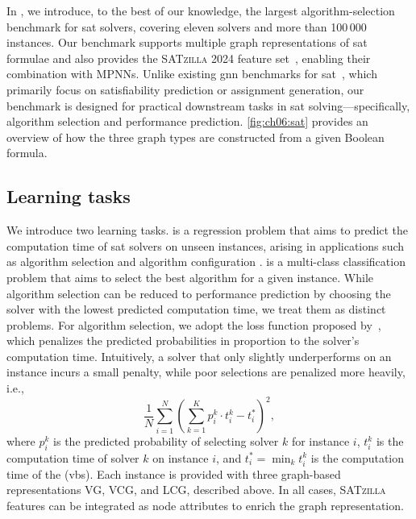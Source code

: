 In \gb, we introduce, to the best of our knowledge, the largest algorithm-selection benchmark for \gls{sat} solvers, covering eleven solvers and more than 100\,000 instances. Our benchmark supports multiple graph representations of \gls{sat} formulae and also provides the \textsc{SATzilla} 2024 feature set~\citep{ShaHoo24b}, enabling their combination with MPNNs. Unlike existing \gls{gnn} benchmarks for \gls{sat}~\citep{LiEtAl24c}, which primarily focus on satisfiability prediction or assignment generation, our benchmark is designed for practical downstream tasks in \gls{sat} solving---specifically, algorithm selection and performance prediction.
\cref{fig:ch06:sat} provides an overview of how the three graph types are constructed from a given Boolean formula.


\subsection{Learning tasks}
We introduce two learning tasks.  is a regression problem that aims to predict the computation time of \gls{sat} solvers on unseen instances, arising in applications such as algorithm selection \citep{Rice76b} and algorithm configuration \citep[e.g.][]{LinEtAl22b}.  is a multi-class classification problem that aims to select the best algorithm for a given instance.
While algorithm selection can be reduced to performance prediction by choosing the solver with the lowest predicted computation time, we treat them as distinct problems. For algorithm selection, we adopt the loss function proposed by~\citep{ZhaEtAl24b}, which penalizes the predicted probabilities in proportion to the solver's computation time. Intuitively, a solver that only slightly underperforms on an instance incurs a small penalty, while poor selections are penalized more heavily, i.e.,
\begin{equation*}
	\frac{1}{N} \sum_{i=1}^N \left( \sum_{k=1}^K p_i^k \cdot t_i^k - t_i^* \right)^2,
\end{equation*}
where $p_i^k$ is the predicted probability of selecting solver $k$ for instance $i$, $t_i^k$ is the computation time of solver $k$ on instance $i$, and $t_i^* = \min_k t_i^k$ is the computation time of the  (\gls{vbs}). Each instance is provided with
three graph-based representations VG, VCG, and LCG, described above.
In all cases, \textsc{SATzilla} features can be integrated as node attributes to enrich the graph representation.

